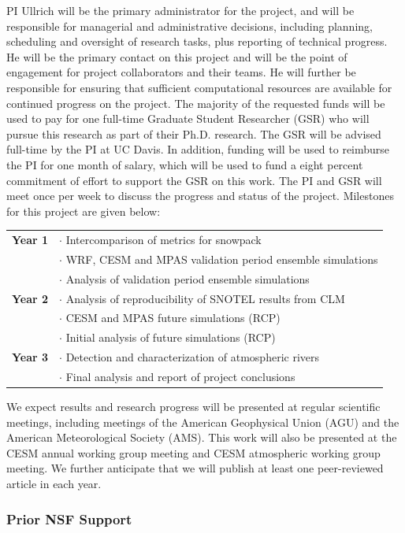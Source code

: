\documentclass[11pt]{article}
\begin{document}
PI Ullrich will be the primary administrator for the project, and will be responsible for managerial and administrative decisions, including planning, scheduling and oversight of research tasks, plus reporting of technical progress. He will be the primary contact on this project and will be the point of engagement for project collaborators and their teams. He will further be responsible for ensuring that sufficient computational resources are available for continued progress on the project. The majority of the requested funds will be used to pay for one full-time Graduate Student Researcher (GSR) who will pursue this research as part of their Ph.D. research. The GSR will be advised full-time by the PI at UC Davis. In addition, funding will be used to reimburse the PI for one month of salary, which will be used to fund a eight percent commitment of effort to support the GSR on this work. The PI and GSR will meet once per week to discuss the progress and status of the project. Milestones for this project are given below:

\begin{tabularx}{\textwidth}{cX}
\hline
\textbf{Year 1} & $\cdot$ Intercomparison of metrics for snowpack \\
& $\cdot$ WRF, CESM and MPAS validation period ensemble simulations \\
& $\cdot$ Analysis of validation period ensemble simulations \\
\hline
\textbf{Year 2} & $\cdot$ Analysis of reproducibility of SNOTEL results from CLM \\
& $\cdot$ CESM and MPAS future simulations (RCP) \\
& $\cdot$ Initial analysis of future simulations (RCP) \\
\hline
\textbf{Year 3} & $\cdot$ Detection and characterization of atmospheric rivers \\
& $\cdot$ Final analysis and report of project conclusions \\
\hline
\end{tabularx}

We expect results and research progress will be presented at regular scientific meetings, including meetings of the American Geophysical Union (AGU) and the American Meteorological Society (AMS). This work will also be presented at the CESM annual working group meeting and CESM atmospheric working group meeting. We further anticipate that we will publish at least one peer-reviewed article in each year.

\subsubsection{Prior NSF Support}
\end{document}
